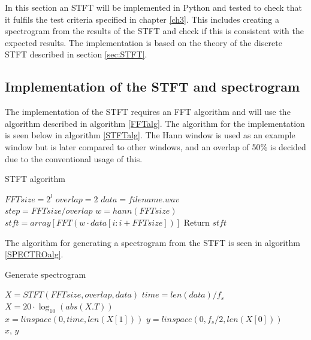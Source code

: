 In this section an STFT will be implemented in Python and tested to check that it fulfils the test criteria specified in chapter \ref{ch3}. This includes creating a spectrogram from the results of the STFT and check if this is consistent with the expected results. The implementation is based on the theory of the discrete STFT described in section \ref{sec:STFT}.

\subsection{Implementation of the STFT and spectrogram}
The implementation of the STFT requires an FFT algorithm and will use the algorithm described in algorithm \ref{FFTalg}. The algorithm for the implementation is seen below in algorithm \ref{STFTalg}. The Hann window is used as an example window but is later compared to other windows, and an overlap of 50\% is decided due to the conventional usage of this. 
\begin{algorithm}[H]
\caption{STFT algorithm}
\label{STFTalg}
\begin{algorithmic}[1]
\State $FFTsize=2^{l}$ 
\State $overlap=2$ 
\State $data = filename.wav$ \\
\State $step=FFTsize/overlap$
\State $w=hann(FFTsize)$ 
\State $stft = array[FFT(w\cdot data[i:i+FFTsize])]$
\EndFor
\State Return $stft$
\EndProcedure
\end{algorithmic}
\end{algorithm}
The algorithm for generating a spectrogram from the STFT is seen in algorithm \ref{SPECTROalg}.
\begin{algorithm}[H]
\caption{Generate spectrogram}
\label{SPECTROalg}
\begin{algorithmic}[1]
	\State $X=STFT(FFTsize,overlap,data)$ 					
	\State $time=len(data)/f_s$ 
	\State $X=20\cdot \log_{10}(abs(X.T))$ \\
	\State $x=linspace(0,time,len(X[1]))$ 		
	\State $y=linspace(0,f_s/2,len(X[0]))$ 	\\
	\Return $x$, $y$
\EndProcedure
\end{algorithmic}
\end{algorithm}

